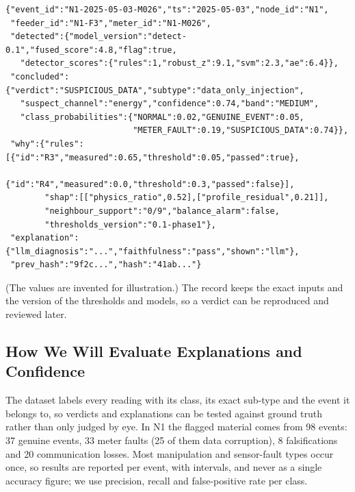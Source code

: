 \documentclass[11pt,a4paper]{article}
\begin{document}
\begin{lstlisting}
{"event_id":"N1-2025-05-03-M026","ts":"2025-05-03","node_id":"N1",
 "feeder_id":"N1-F3","meter_id":"N1-M026",
 "detected":{"model_version":"detect-0.1","fused_score":4.8,"flag":true,
   "detector_scores":{"rules":1,"robust_z":9.1,"svm":2.3,"ae":6.4}},
 "concluded":{"verdict":"SUSPICIOUS_DATA","subtype":"data_only_injection",
   "suspect_channel":"energy","confidence":0.74,"band":"MEDIUM",
   "class_probabilities":{"NORMAL":0.02,"GENUINE_EVENT":0.05,
                          "METER_FAULT":0.19,"SUSPICIOUS_DATA":0.74}},
 "why":{"rules":[{"id":"R3","measured":0.65,"threshold":0.05,"passed":true},
                 {"id":"R4","measured":0.0,"threshold":0.3,"passed":false}],
        "shap":[["physics_ratio",0.52],["profile_residual",0.21]],
        "neighbour_support":"0/9","balance_alarm":false,
        "thresholds_version":"0.1-phase1"},
 "explanation":{"llm_diagnosis":"...","faithfulness":"pass","shown":"llm"},
 "prev_hash":"9f2c...","hash":"41ab..."}
\end{lstlisting}
(The values are invented for illustration.) The record keeps the exact inputs and the version of the
thresholds and models, so a verdict can be reproduced and reviewed later.

\subsection{How We Will Evaluate Explanations and Confidence}
\label{sec:evaluation}
The dataset labels every reading with its class, its exact sub-type and the event it belongs to, so verdicts
and explanations can be tested against ground truth rather than only judged by eye. In N1 the flagged
material comes from 98 events: 37 genuine events, 33 meter faults (25 of them data corruption), 8
falsifications and 20 communication losses. Most manipulation and sensor-fault types occur once, so results are
reported per event, with intervals, and never as a single accuracy figure; we use precision, recall and
false-positive rate per class.
\end{document}
